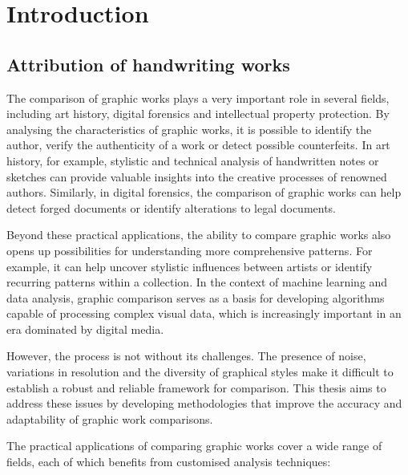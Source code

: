 \chapter{Introduction}
\begin{toReview}
	\section{Attribution of handwriting works}
		\noindent The comparison of graphic works plays a very important role in several fields, including art history, digital forensics and intellectual property protection. By analysing the characteristics of graphic works, it is possible to identify the author, verify the authenticity of a work or detect possible counterfeits. In art history, for example, stylistic and technical analysis of handwritten notes or sketches can provide valuable insights into the creative processes of renowned authors. Similarly, in digital forensics, the comparison of graphic works can help detect forged documents or identify alterations to legal documents.

		\noindent Beyond these practical applications, the ability to compare graphic works also opens up possibilities for understanding more comprehensive patterns. For example, it can help uncover stylistic influences between artists or identify recurring patterns within a collection. In the context of machine learning and data analysis, graphic comparison serves as a basis for developing algorithms capable of processing complex visual data, which is increasingly important in an era dominated by digital media.

		\noindent However, the process is not without its challenges. The presence of noise, variations in resolution and the diversity of graphical styles make it difficult to establish a robust and reliable framework for comparison. This thesis aims to address these issues by developing methodologies that improve the accuracy and adaptability of graphic work comparisons.

		\bigskip
		\noindent The practical applications of comparing graphic works cover a wide range of fields, each of which benefits from customised analysis techniques:


\end{toReview}
